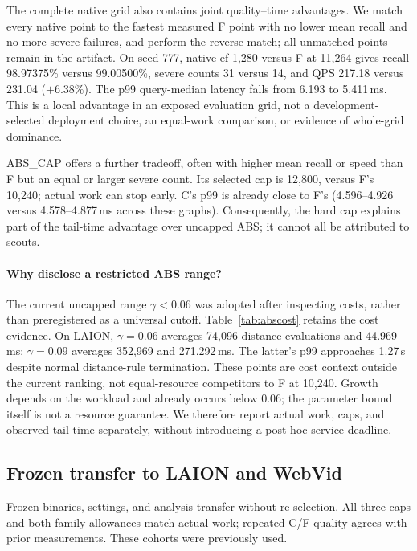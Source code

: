 The complete native grid also contains joint quality--time advantages. We match every native point to the fastest measured F point with no lower mean recall and no more severe failures, and perform the reverse match; all unmatched points remain in the artifact. On seed 777, native ef 1,280 versus F at 11,264 gives recall 98.97375\% versus 99.00500\%, severe counts 31 versus 14, and QPS 217.18 versus 231.04 ($+6.38\%$). The p99 query-median latency falls from 6.193 to 5.411\,ms. This is a local advantage in an exposed evaluation grid, not a development-selected deployment choice, an equal-work comparison, or evidence of whole-grid dominance.

ABS\_CAP offers a further tradeoff, often with higher mean recall or speed than F but an equal or larger severe count. Its selected cap is 12,800, versus F's 10,240; actual work can stop early. C's p99 is already close to F's (4.596--4.926 versus 4.578--4.877\,ms across these graphs). Consequently, the hard cap explains part of the tail-time advantage over uncapped ABS; it cannot all be attributed to scouts.

\paragraph{Why disclose a restricted ABS range?}
The current uncapped range $\gamma<0.06$ was adopted after inspecting costs, rather than preregistered as a universal cutoff. Table~\ref{tab:abscost} retains the cost evidence. On LAION, $\gamma=0.06$ averages 74,096 distance evaluations and 44.969\,ms; $\gamma=0.09$ averages 352,969 and 271.292\,ms. The latter's p99 approaches 1.27\,s despite normal distance-rule termination. These points are cost context outside the current ranking, not equal-resource competitors to F at 10,240. Growth depends on the workload and already occurs below 0.06; the parameter bound itself is not a resource guarantee. We therefore report actual work, caps, and observed tail time separately, without introducing a post-hoc service deadline.



\subsection{Frozen transfer to LAION and WebVid}\label{sec:transfer}
Frozen binaries, settings, and analysis transfer without re-selection. All three caps and both family allowances match actual work; repeated C/F quality agrees with prior measurements. These cohorts were previously used.

